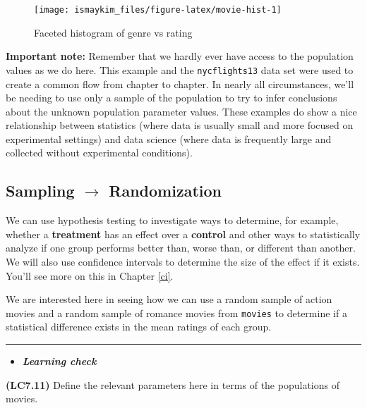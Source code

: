\documentclass[]{tufte-book}
\let\oldrule=\rule
\renewcommand{\rule}[1]{\oldrule{\linewidth}}
\newenvironment{rmdblock}[1]
  {\begin{shaded*}
  \begin{itemize}
  \renewcommand{\labelitemi}{
    \raisebox{-.7\height}[0pt][0pt]{
    }
  }
  \item
  }
  {
  \end{itemize}
  \end{shaded*}
  }
\newenvironment{learncheck}
  {\begin{rmdblock}{warning}}
  {\end{rmdblock}}
\begin{document}
\begin{figure}

{\centering \texttt{[image: ismaykim\_files/figure-latex/movie-hist-1]} 

}

\caption[Faceted histogram of genre vs rating]{Faceted histogram of genre vs rating}\label{fig:movie-hist}
\end{figure}

\textbf{Important note:} Remember that we hardly ever have access to the
population values as we do here. This example and the
\texttt{nycflights13} data set were used to create a common flow from
chapter to chapter. In nearly all circumstances, we'll be needing to use
only a sample of the population to try to infer conclusions about the
unknown population parameter values. These examples do show a nice
relationship between statistics (where data is usually small and more
focused on experimental settings) and data science (where data is
frequently large and collected without experimental conditions).

\subsection{\texorpdfstring{Sampling \(\rightarrow\)
Randomization}{Sampling \textbackslash{}rightarrow Randomization}}\label{sampling-rightarrow-randomization}

We can use hypothesis testing to investigate ways to determine, for
example, whether a \textbf{treatment} has an effect over a
\textbf{control} and other ways to statistically analyze if one group
performs better than, worse than, or different than another. We will
also use confidence intervals to determine the size of the effect if it
exists. You'll see more on this in Chapter \ref{ci}.

We are interested here in seeing how we can use a random sample of
action movies and a random sample of romance movies from \texttt{movies}
to determine if a statistical difference exists in the mean ratings of
each group.

\begin{center}\rule{0.5\linewidth}{\linethickness}\end{center}

\begin{learncheck}
\textbf{\emph{Learning check}}
\end{learncheck}

\textbf{(LC7.11)} Define the relevant parameters here in terms of the
populations of movies.
\end{document}
